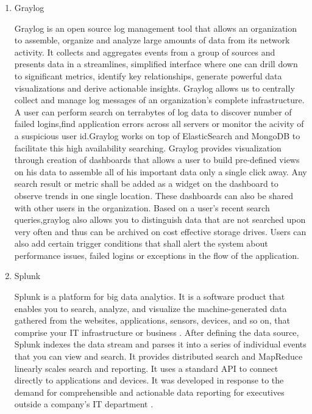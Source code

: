 \begin{enumerate}
\item {} 
Graylog

Graylog is an open source log management tool that allows an
organization to assemble, organize and analyze large amounts of
data from its network activity. It collects and aggregates events
from a group of sources and presents data in a streamlines,
simplified interface where one can drill down to significant
metrics, identify key relationships, generate powerful data
visualizations and derive actionable
insights. \label{\detokenize{i524/technologies:id144}}{\hyperref[\detokenize{i524/technologies:www-graylog-blog}]{\sphinxcrossref{{[}126{]}}}}
\label{\detokenize{i524/technologies:id145}}{\hyperref[\detokenize{i524/technologies:www-graylog-optimization}]{\sphinxcrossref{{[}127{]}}}} Graylog allows us to centrally
collect and manage log messages of an organization's complete
infrastructure. A user can perform search on terrabytes of log
data to discover number of failed logins,find application errors
across all servers or monitor the acivity of a suspicious user
id.Graylog works on top of ElasticSearch and MongoDB to facilitate
this high availability searching.  Graylog provides visualization
through creation of dashboards that allows a user to build
pre-defined views on his data to assemble all of his important
data only a single click away. \label{\detokenize{i524/technologies:id146}}{\hyperref[\detokenize{i524/technologies:www-graylog-dashboards}]{\sphinxcrossref{{[}128{]}}}} Any
search result or metric shall be added as a widget on the
dashboard to observe trends in one single location. These
dashboards can also be shared with other users in the
organization. Based on a user's recent search queries,graylog also
allows you to distinguish data that are not searched upon very
often and thus can be archived on cost effective storage
drives. Users can also add certain trigger conditions that shall
alert the system about performance issues, failed logins or
exceptions in the flow of the application.

\item {} 
Splunk

Splunk is a platform for big data analytics. It is a software
product that enables you to search, analyze, and visualize the
machine-generated data gathered from the websites, applications,
sensors, devices, and so on, that comprise your IT infrastructure
or business \label{\detokenize{i524/technologies:id147}}{\hyperref[\detokenize{i524/technologies:www-splunk}]{\sphinxcrossref{{[}129{]}}}}. After defining the data source,
Splunk indexes the data stream and parses it into a series of
individual events that you can view and search. It provides
distributed search and MapReduce linearly scales search and
reporting. It uses a standard API to connect directly to
applications and devices. It was developed in response to the
demand for comprehensible and actionable data reporting for
executives outside a company's IT department \label{\detokenize{i524/technologies:id148}}{\hyperref[\detokenize{i524/technologies:www-splunk}]{\sphinxcrossref{{[}129{]}}}}.


\end{enumerate}
